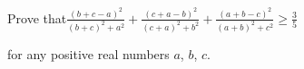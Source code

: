 Prove that$ \frac{\left(b+c-a\right)^{2}}{\left(b+c\right)^{2}+a^{2}}+\frac{\left(c+a-b\right)^{2}}{\left(c+a\right)^{2}+b^{2}}+\frac{\left(a+b-c\right)^{2}}{\left(a+b\right)^{2}+c^{2}}\geq\frac35$

for any positive real numbers $ a$, $ b$, $ c$.